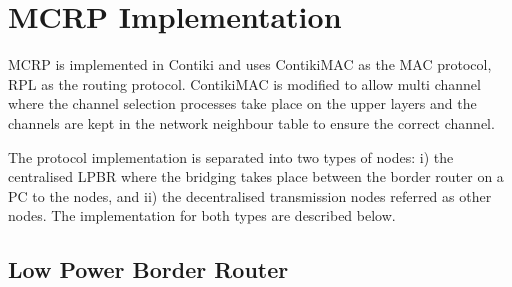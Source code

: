 

\section{MCRP Implementation}
MCRP is implemented in Contiki and uses ContikiMAC as the MAC protocol, RPL as the routing protocol. ContikiMAC is modified to allow multi channel where the channel selection processes take place on the upper layers and the channels are kept in the network neighbour table to ensure the correct channel.

The protocol implementation is separated into two types of nodes: i) the centralised LPBR where the bridging takes place between the border router on a PC to the nodes, and ii) the decentralised transmission nodes referred as other nodes. The implementation for both types are described below.



\subsection{Low Power Border Router}

